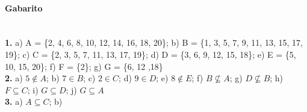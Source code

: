 \documentclass[a4paper,twocolumn,12pt]{article}
\begin{document}
{\footnotesize
\paragraph*{Gabarito} \hspace*{\fill}\\
\textbf{1.} a) A = \{2, 4, 6, 8, 10, 12, 14, 16, 18, 20\}; b) B = \{1, 3, 5, 7, 9, 11, 13, 15, 17, 19\}; c) C = \{2, 3, 5, 7, 11, 13, 17, 19\}; d) D = \{3, 6, 9, 12, 15, 18\}; e) E = \{5, 10, 15, 20\}; f) F = \{2\}; g) G = \{6, 12 ,18\}\\
\textbf{2.} a) \(5\notin A\); b) \(7\in B\); c) \(2\in C\); d) \(9\in D\); e) \(8\notin E\); f) \(B\not\subseteq A\); g) \(D\not\subseteq B\); h) \(F\subseteq C\); i) \(G\subseteq D\); j) \(G\subseteq A\)\\
\textbf{3.} a) \(A \subseteq C\); b) 


}
\end{document}
